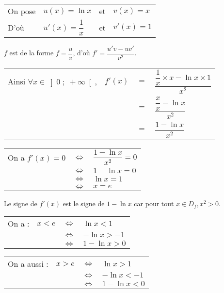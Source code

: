 \begin{tabular}{llll}
On pose & $u(x) = \ln x$ & et & $v(x) = x$ \\
D'où & $u'(x) = \dfrac{1}{x}$ & et & $v'(x) = 1$ \\
\end{tabular}

\vspace*{.3cm}

$f$ est de la forme $f = \dfrac{u}{v}$, d'où $f' = \dfrac{u'v - uv'}{v^2}$. \vspace*{.3cm} \\

\begin{tabular}{llll}
Ainsi $\forall x \in \left]0 \; ; \; +\infty\right[$, & $f'(x)$ & $=$ & $\dfrac{\dfrac{1}{x} \times x - \ln x \times 1}{x^2}$ \vspace*{.3cm} \\
& & $=$ & $\dfrac{\dfrac{x}{x} - \ln x}{x^2}$ \vspace*{.3cm} \\
& & $=$ & $\dfrac{1 - \ln x}{x^2}$ \vspace*{.3cm} \\
\end{tabular}

\begin{tabular}{lll}
On a $f'(x) = 0$ & $\Longleftrightarrow$ & $\dfrac{1-\ln x}{x^2} = 0$ \\
& $\Longleftrightarrow$ & $1 - \ln x = 0$ \\
& $\Longleftrightarrow$ & $\ln x = 1$ \\
& $\Longleftrightarrow$ & $x = e$ \\
\end{tabular}

\vspace*{.3cm}

Le signe de $f'(x)$ est le signe de $1 - \ln x$ car pour tout $x \in D_f, x^2>0$. \\

\begin{tabular}{llll}
On a : & $x<e$ & $\Longleftrightarrow$ & $\ln x < 1$ \\
& & $\Longleftrightarrow$ & $-\ln x > -1$ \\
& & $\Longleftrightarrow$ & $1 - \ln x > 0$ \\
\end{tabular}

\vspace*{.3cm}

\begin{tabular}{llll}
On a aussi : & $x>e$ & $\Longleftrightarrow$ & $\ln x > 1$ \\
& & $\Longleftrightarrow$ & $-\ln x < -1$ \\
& & $\Longleftrightarrow$ & $1 - \ln x < 0$ \\
\end{tabular}

